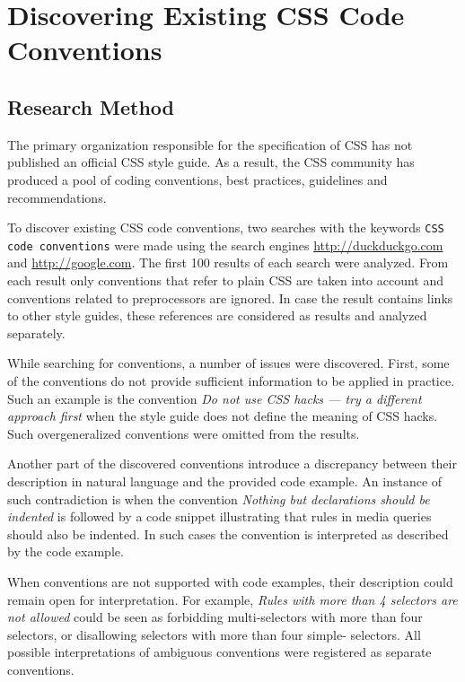 \chapter{Discovering Existing CSS Code Conventions}
\label{sec:discovering}

\section{Research Method}

The primary organization responsible for the specification of CSS has not
published an official CSS style guide. As a result, the CSS community has
produced a pool of coding conventions, best practices, guidelines and
recommendations.

To discover existing CSS code conventions, two searches with the keywords
\texttt{CSS code conventions} were made using the search engines
\url{http://duckduckgo.com} and \url{http://google.com}. The first 100 results
of each search were analyzed. From each result only conventions that refer to
plain CSS are taken into account and conventions related to preprocessors are
ignored. In case the result contains links to other style guides, these
references are considered as results and analyzed separately.

While searching for conventions, a number of issues were discovered. First,
some of the conventions do not provide sufficient information to be applied in
practice. Such an example is the convention \textit{Do not use CSS hacks --- try
a different approach first} when the style guide does not define the meaning
of CSS hacks. Such overgeneralized conventions were omitted from the results.

Another part of the discovered conventions introduce a discrepancy between
their description in natural language and the provided code example. An
instance of such contradiction is when the convention \textit{Nothing but
declarations should be indented} is followed by a code snippet illustrating
that rules in media queries should also be indented. In such cases the
convention is interpreted as described by the code example.

When conventions are not supported with code examples, their description could
remain open for interpretation. For example, \textit{Rules with more than 4
selectors are not allowed} could be seen as forbidding multi-selectors with
more than four selectors, or disallowing selectors with more than four simple-
selectors. All possible interpretations of ambiguous conventions were
registered as separate conventions.

